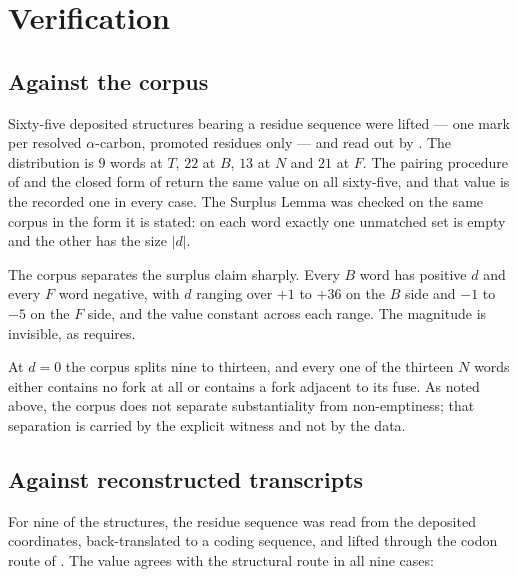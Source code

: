 \documentclass[12pt,a4paper]{article}
\begin{document}
\section{Verification}\label{sec:verification}

\subsection{Against the corpus}

Sixty-five deposited structures bearing a residue sequence were lifted --- one mark
per resolved $\alpha$-carbon, promoted residues only --- and read out by
. The distribution is $9$ words at $T$, $22$ at $B$, $13$ at $N$
and $21$ at $F$. The pairing procedure of  and the closed form of
 return the same value on all sixty-five, and that value is the
recorded one in every case. The Surplus Lemma was checked on the same corpus in the
form it is stated: on each word exactly one unmatched set is empty and the other has
the size $|d|$.

The corpus separates the surplus claim sharply. Every $B$ word has positive
$d$ and every $F$ word negative, with $d$ ranging over $+1$ to $+36$ on the $B$
side and $-1$ to $-5$ on the $F$ side, and the value constant across each range.
The magnitude is invisible, as  requires.

At $d = 0$ the corpus splits nine to thirteen, and every one of the thirteen $N$
words either contains no fork at all or contains a fork adjacent to its fuse. As
noted above, the corpus does not separate substantiality from non-emptiness; that
separation is carried by the explicit witness and not by the data.

\subsection{Against reconstructed transcripts}

For nine of the structures, the residue sequence was read from the deposited
coordinates, back-translated to a coding sequence, and lifted through the codon
route of . The value agrees with the structural route in all nine
cases:
\end{document}
